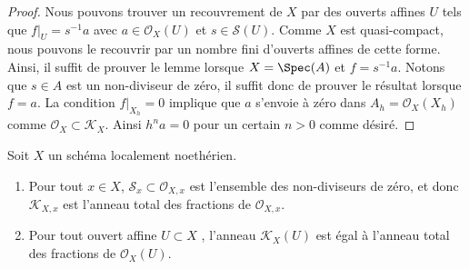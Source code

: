 \begin{proof}
Nous pouvons trouver un recouvrement de  $X$  par des ouverts affines
 $U$  tels que  $f|_U = s^{-1}a$  avec  $a \in \mathcal{O}_X(U)$  et  $s \in \mathcal{S}(U)$. Comme
 $X$  est quasi-compact, nous pouvons le recouvrir par un nombre fini
d'ouverts affines de cette forme. Ainsi, il suffit de prouver le lemme lorsque
 $X = \Spec(A)$  et  $f = s^{-1}a$. Notons que  $s \in A$  est un non-diviseur de zéro,
il suffit donc de prouver le résultat lorsque  $f = a$. La condition
 $f|_{X_h} = 0$  implique que  $a$  s'envoie à zéro dans  $A_h = \mathcal{O}_X(X_h)$  comme
 $\mathcal{O}_X \subset \mathcal{K}_X$. Ainsi  $h^na = 0$  pour un certain  $n > 0$  comme désiré.
\end{proof}

\begin{lemma}
\label{lemma-locally-Noetherian-K}
Soit  $X$  un schéma localement noethérien.
\begin{enumerate}
 \item Pour tout  $x \in X$,  $\mathcal{S}_x \subset \mathcal{O}_{X, x}$  est l'ensemble des
 non-diviseurs de zéro, et donc  $\mathcal{K}_{X, x}$  est l'anneau total des fractions de  $\mathcal{O}_{X, x}$.
 \item Pour tout ouvert affine  $U \subset X$ , l'anneau  $\mathcal{K}_X(U)$  est égal à l'anneau total
 des fractions de  $\mathcal{O}_X(U)$.
\end{enumerate}
\end{lemma}

